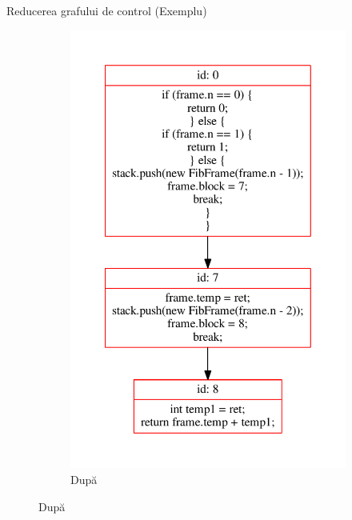 \documentclass{beamer}
\begin{document}
\begin{frame}{Reducerea grafului de control (Exemplu)}
\begin{figure}[htb]
\begin{subfigure}[b]{.42\textwidth}
            \includegraphics[width=\textwidth]{../../../theses/diploma/src/graph/inline-after.pdf}
            \caption{După}
        \end{subfigure}
    \end{figure}
\end{frame}
\end{document}
